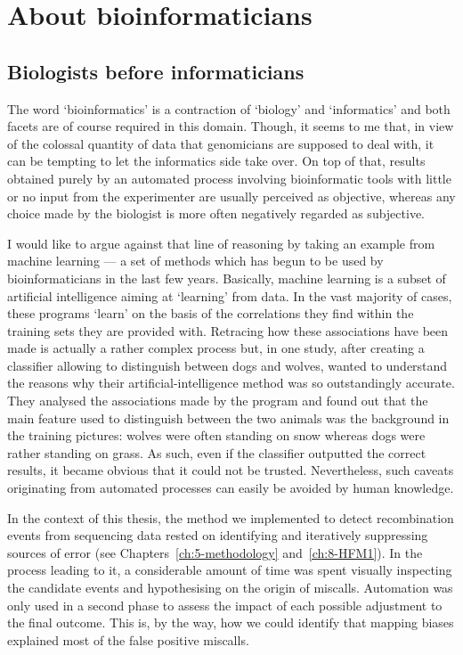 
\section{About bioinformaticians}

\subsection{Biologists before informaticians} 

The word ‘bioinformatics’ is a contraction of ‘biology’ and ‘informatics’ and both facets are of course required in this domain.
Though, it seems to me that, in view of the colossal quantity of data that genomicians are supposed to deal with, it can be tempting to let the informatics side take over.
On top of that, results obtained purely by an automated process involving bioinformatic tools with little or no input from the experimenter are usually perceived as objective, whereas any choice made by the biologist is more often negatively regarded as subjective.

I would like to argue against that line of reasoning by taking an example from machine learning — a set of methods which has begun to be used by bioinformaticians in the last few years.
Basically, machine learning is a subset of artificial intelligence aiming at ‘learning’ from data.
In the vast majority of cases, these programs ‘learn’ on the basis of the correlations they find within the training sets they are provided with.
Retracing how these associations have been made is actually a rather complex process but, in one study, after creating a classifier allowing to distinguish between dogs and wolves, \citet{ribeiro2016why} wanted to understand the reasons why their artificial-intelligence method was so outstandingly accurate.
They analysed the associations made by the program and found out that the main feature used to distinguish between the two animals was the background in the training pictures: wolves were often standing on snow whereas dogs were rather standing on grass.
As such, even if the classifier outputted the correct results, it became obvious that it could not be trusted.
Nevertheless, such caveats originating from automated processes can easily be avoided by human knowledge.

In the context of this thesis, the method we implemented to detect recombination events from sequencing data rested on identifying and iteratively suppressing sources of error (see Chapters~\ref{ch:5-methodology} and~\ref{ch:8-HFM1}).
In the process leading to it, a considerable amount of time was spent visually inspecting the candidate events and hypothesising on the origin of miscalls.
Automation was only used in a second phase to assess the impact of each possible adjustment to the final outcome.
This is, by the way, how we could identify that mapping biases explained most of the false positive miscalls.

